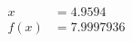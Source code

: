 \documentclass[preview]{standalone}
\begin{document}
\begin{align*}
x &= 4.9594\\f(x) &= 7.9997936
\end{align*}
\end{document}
